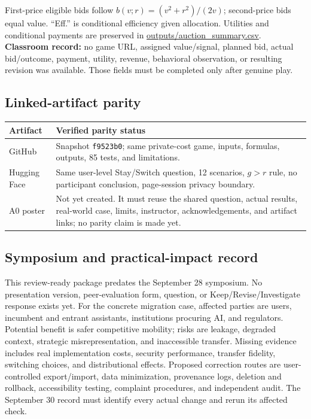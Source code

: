 First-price eligible bids follow $b(v;r)=(v^2+r^2)/(2v)$; second-price bids equal value. ``Eff.'' is conditional efficiency given allocation. Utilities and conditional payments are preserved in \url{outputs/auction_summary.csv}. \textbf{Classroom record:} no game URL, assigned value/signal, planned bid, actual bid/outcome, payment, utility, revenue, behavioral observation, or resulting revision was available. Those fields must be completed only after genuine play.

\subsection{Linked-artifact parity}
\begin{tabularx}{\columnwidth}{@{}p{1.55cm}Y@{}}\toprule
\textbf{Artifact}&\textbf{Verified parity status}\\\midrule
GitHub&Snapshot \texttt{f9523b0}; same private-cost game, inputs, formulas, outputs, 85 tests, and limitations.\\
Hugging Face&Same user-level Stay/Switch question, 12 scenarios, $g>r$ rule, no participant conclusion, page-session privacy boundary.\\
A0 poster&Not yet created. It must reuse the shared question, actual results, real-world case, limits, instructor, acknowledgements, and artifact links; no parity claim is made yet.\\\bottomrule
\end{tabularx}

\subsection{Symposium and practical-impact record}
This review-ready package predates the September 28 symposium. No presentation version, peer-evaluation form, question, or Keep/\allowbreak Revise/\allowbreak Investigate response exists yet. For the concrete migration case, affected parties are users, incumbent and entrant assistants, institutions procuring AI, and regulators. Potential benefit is safer competitive mobility; risks are leakage, degraded context, strategic misrepresentation, and inaccessible transfer. Missing evidence includes real implementation costs, security performance, transfer fidelity, switching choices, and distributional effects. Proposed correction routes are user-controlled export/import, data minimization, provenance logs, deletion and rollback, accessibility testing, complaint procedures, and independent audit. The September 30 record must identify every actual change and rerun its affected check.
